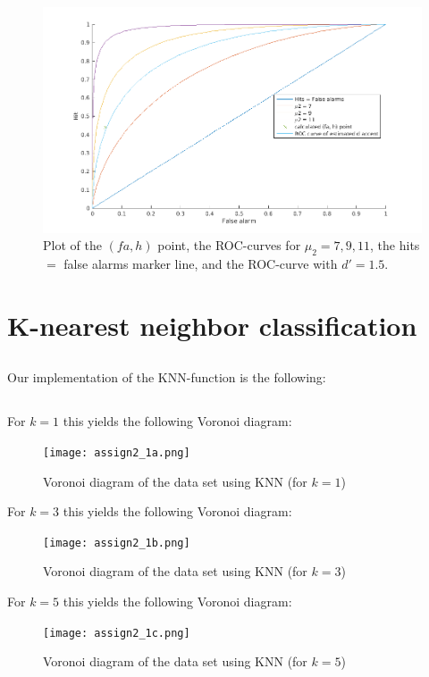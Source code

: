 \documentclass[10pt]{article}
\begin{document}
\begin{figure}[H]
 \centering
 \includegraphics[width=\textwidth]{assign1_2b.png}
 \caption{Plot of the $(fa, h)$ point, the ROC-curves for $\mu_2={7, 9, 11}$, the hits $=$ false alarms marker line, and the ROC-curve with $d'=1.5$.}
 \label{fig1.2}
\end{figure}

\section{K-nearest neighbor classification}
\subsection{}
Our implementation of the KNN-function is the following:


\subsection{}
For $k=1$ this yields the following Voronoi diagram:
\begin{figure}[H]
 \centering
 \texttt{[image: assign2\_1a.png]}
 \caption{Voronoi diagram of the data set using KNN (for $k=1$)}
 \label{fig2.1a}
\end{figure}

For $k=3$ this yields the following Voronoi diagram:
\begin{figure}[H]
 \centering
 \texttt{[image: assign2\_1b.png]}
 \caption{Voronoi diagram of the data set using KNN (for $k=3$)}
 \label{fig2.1b}
\end{figure}

For $k=5$ this yields the following Voronoi diagram:
\begin{figure}[H]
 \centering
 \texttt{[image: assign2\_1c.png]}
 \caption{Voronoi diagram of the data set using KNN (for $k=5$)}
 \label{fig2.1c}
\end{figure}
\end{document}
